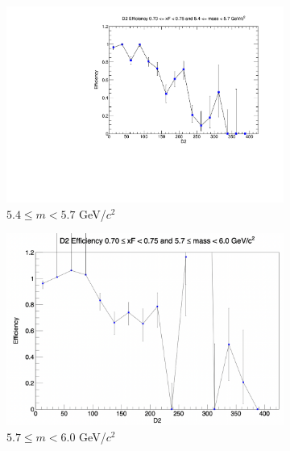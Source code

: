 \begin{figure}[p]
\begin{subfigure}[b]{0.32\textwidth}
        \includegraphics[width=\textwidth]{./kTrackerEfficiencyPlots/D2_Efficiency_xF14_mass4.pdf}
        \caption{$5.4 \leq m < 5.7$ GeV/$c^2$}
        \label{fig:xF14_mass4}
    \end{subfigure}
    \hfill
    \begin{subfigure}[b]{0.32\textwidth}
        \centering
        \includegraphics[width=\textwidth]{./kTrackerEfficiencyPlots/D2_Efficiency_xF14_mass5.png}
        \caption{$5.7 \leq m < 6.0$ GeV/$c^2$}
        \label{fig:xF14_mass5}
    \end{subfigure}
    \vspace{0.5cm}
    \begin{subfigure}[b]{0.32\textwidth}
        \centering

\end{subfigure}
\end{figure}
